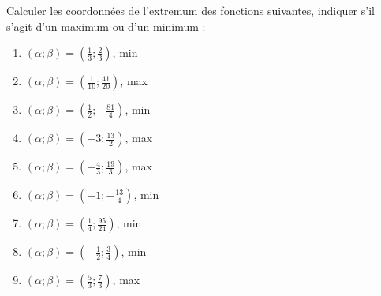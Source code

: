 \begin{solution}
Calculer les coordonnées de l'extremum des fonctions suivantes, indiquer s'il s'agit d'un maximum ou d'un minimum :
 \begin{enumerate}
\item $\left( \alpha ;\beta  \right)=\left( \frac{1}{3};\frac{2}{3} \right)$, min
\item $\left( \alpha ;\beta  \right)=\left( \frac{1}{10};\frac{41}{20} \right)$, max
\item $\left( \alpha ;\beta  \right)=\left( \frac{1}{2};-\frac{81}{4} \right)$, min
\item $\left( \alpha ;\beta  \right)=\left( -3;\frac{13}{2} \right)$, max
\item $\left( \alpha ;\beta  \right)=\left( -\frac{4}{3};\frac{19}{3} \right)$, max
\item $\left( \alpha ;\beta  \right)=\left( -1;-\frac{13}{4} \right)$, min
\item $\left( \alpha ;\beta  \right)=\left( \frac{1}{4};\frac{95}{24} \right)$, min
\item $\left( \alpha ;\beta  \right)=\left( -\frac{1}{2};\frac{3}{4} \right)$, min
\item $\left( \alpha ;\beta  \right)=\left( \frac{5}{3};\frac{7}{3} \right)$, max
\end{enumerate}
\end{solution}

